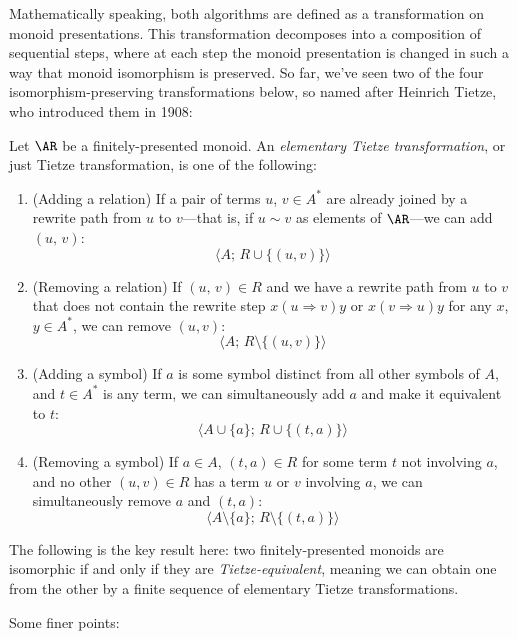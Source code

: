 \documentclass[../generics]{subfiles}
\begin{document}
Mathematically speaking, both algorithms are defined as a transformation on monoid presentations. This transformation decomposes into a composition of sequential steps, where at each step the monoid presentation is changed in such a way that monoid isomorphism is preserved. So far, we've seen two of the four isomorphism-preserving transformations below, so named after Heinrich Tietze, who introduced them in 1908:
\begin{definition}
Let $\AR$ be a finitely-presented monoid. An \emph{elementary Tietze transformation}, or just Tietze transformation, is one of the following:
\begin{enumerate}
\item (Adding a relation) If a pair of terms $u$, $v\in A^*$ are already joined by a rewrite path from $u$ to $v$---that is, if $u\sim v$ as elements of $\AR$---we can add $(u,\,v)$:
\[\langle A;\,R\cup\{(u,v)\}\rangle\]
\item (Removing a relation) If $(u,\,v)\in R$ and we have a rewrite path from $u$ to $v$ that does not contain the rewrite step $x(u\Rightarrow v)y$ or $x(v\Rightarrow u)y$ for any $x$, $y\in A^*$, we can remove $(u,v)$:
\[\langle A;\,R\setminus\{(u,v)\}\rangle\]
\item (Adding a symbol) If $a$ is some symbol distinct from all other symbols of $A$, and $t\in A^*$ is any term, we can simultaneously add $a$ and make it equivalent to $t$:
\[\langle A\cup\{a\};\,R\cup\{(t,a)\}\rangle\]
\item (Removing a symbol) If $a\in A$, $(t,a)\in R$ for some term $t$ not involving $a$, and no other $(u,v)\in R$ has a term $u$ or $v$ involving $a$, we can simultaneously remove $a$ and $(t,a)$:
\[\langle A\setminus\{a\};\,R\setminus\{(t,a)\}\rangle\]
\end{enumerate}
The following is the key result here: two finitely-presented monoids are isomorphic if and only if they are \emph{Tietze-equivalent}, meaning we can obtain one from the other by a finite sequence of elementary Tietze transformations.
\end{definition}
Some finer points:
\end{document}
